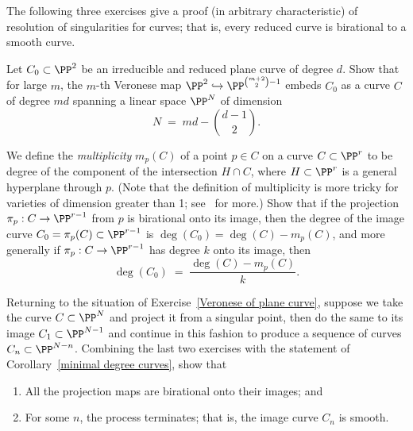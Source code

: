 The following three exercises give a proof (in arbitrary characteristic) of resolution of singularities for curves; that is, every reduced curve is birational to a smooth curve.


\begin{exercise}\label{Veronese of plane curve}
Let $C_0 \subset \PP^2$ be an irreducible and reduced plane curve of degree $d$. Show that for large $m$, the $m$-th Veronese map $\PP^2 \hookrightarrow \PP^{\binom{m+2}{2} - 1}$ embeds $C_0$ as a curve $C$ of degree $md$ spanning a linear space $\PP^N$ of dimension
$$
N \; = \; md - \binom{d-1}{2}.
$$
\end{exercise}


\begin{exercise}
We define the \emph{multiplicity} $m_p(C)$ of a point $p \in C$ on a curve $C \subset \PP^r$ to be degree of the component of the intersection $H \cap C$, where $H \subset \PP^r$ is a general hyperplane through $p$. (Note that the definition of multiplicity is more tricky for varieties of dimension greater than 1; see~\cite{3264} for more.) Show that if the projection $\pi_p : C \to \PP^{r-1}$ from $p$ is birational onto its image, then the degree of the image curve $C_0 = \pi_p(C) \subset \PP^{r-1}$ is $\deg(C_0) = \deg(C) - m_p(C)$, and more generally if $\pi_p : C \to \PP^{r-1}$ has degree $k$ onto its image, then
$$
\deg(C_0) \; = \; \frac{\deg(C) - m_p(C)}{k}.
$$
\end{exercise}


\begin{exercise}\label{Mumford resolution argument}
Returning to the situation of Exercise~\ref{Veronese of plane curve}, suppose we take the curve $C \subset \PP^N$ and project it from a singular point, then do the same to its image $C_1 \subset \PP^{N-1}$ and continue in this fashion to produce a sequence of curves $C_n \subset \PP^{N-n}$. Combining the last two exercises with the statement of Corollary~\ref{minimal degree curves}, show that
\begin{enumerate}
\item All the projection maps are birational onto their images; and
\item For some $n$, the process terminates; that is, the image curve $C_n$ is smooth.
\end{enumerate}
\end{exercise}



 